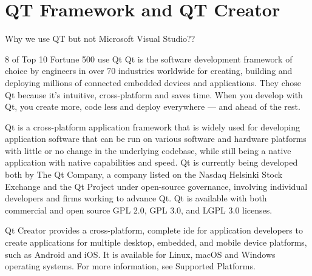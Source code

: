 \section{QT Framework and QT Creator}
\label{sec:qt}

Why we use QT but not Microsoft Visual Studio?? 

8 of Top 10 Fortune 500 use Qt
Qt is the software development framework of choice by engineers in over 70 industries worldwide for creating, building and deploying millions of connected embedded devices and applications. They chose Qt because it’s intuitive, cross-platform and saves time. When you develop with Qt, you create more, code less and deploy everywhere — and ahead of the rest.

Qt is a cross-platform application framework that is widely used for developing application software that can be run on various software and hardware platforms with little or no change in the underlying codebase, while still being a native application with native capabilities and speed. Qt is currently being developed both by The Qt Company, a company listed on the Nasdaq Helsinki Stock Exchange and the Qt Project under open-source governance, involving individual developers and firms working to advance Qt. Qt is available with both commercial and open source GPL 2.0, GPL 3.0, and LGPL 3.0 licenses.

Qt Creator provides a cross-platform, complete \gls{ide} for application developers to create applications for multiple desktop, embedded, and mobile device platforms, such as Android and iOS. It is available for Linux, macOS and Windows operating systems. For more information, see Supported Platforms.
